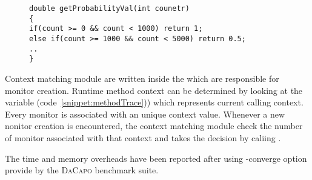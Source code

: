 \begin{figure}[t]
\begin{lstlisting}
double getProbabilityVal(int counetr)
{
if(count >= 0 && count < 1000) return 1;
else if(count >= 1000 && count < 5000) return 0.5;
..
}
\end{lstlisting}
\end{figure}

Context matching module are written inside the  which are
responsible for monitor creation. Runtime method context can be determined by
looking at the  variable (code~\ref{snippet:methodTrace})) which
represents current calling context. Every monitor is associated with an unique
context value. Whenever a new nonitor creation  is encountered,
the context matching module check the number of monitor associated with that
context and takes the decision by caliing
.

The time and memory overheads have been reported after using -converge option 
provide by the \textsc{DaCapo} benchmark suite.